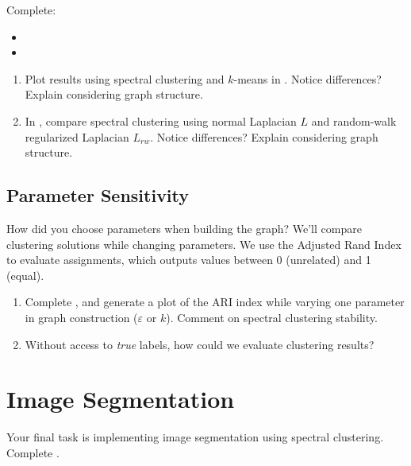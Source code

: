 \documentclass[11pt]{article}
\begin{document}
Complete:
\begin{itemize}[leftmargin=*]
	\item {}
	\item {}
\end{itemize}

\begin{questionbox}
\begin{enumerate}[leftmargin=*,resume]
    \item  Plot results using spectral clustering and $k$-means in
           . Notice differences?
           Explain considering graph structure.
    \item In , compare
        spectral clustering using normal Laplacian $L$ and
        random-walk regularized Laplacian $L_{rw}$.
        Notice differences? Explain considering graph structure.
\end{enumerate}
\end{questionbox}

\subsection{Parameter Sensitivity}

How did you choose parameters when building the graph?
We'll compare clustering solutions while changing parameters.
We use the Adjusted Rand Index \cite{wagner2007comparing} to evaluate assignments,
which outputs values between 0 (unrelated) and 1 (equal).

\begin{questionbox}
\begin{enumerate}[leftmargin=*,resume]
    \item Complete , and
        generate a plot of the ARI index while varying one parameter
        in graph construction ($\varepsilon$ or $k$).
        Comment on spectral clustering stability.
    \item Without access to \emph{true} labels, how could we evaluate
          clustering results?
\end{enumerate}
\end{questionbox}

\section{Image Segmentation}

Your final task is implementing image segmentation using spectral clustering.
Complete .
\end{document}
